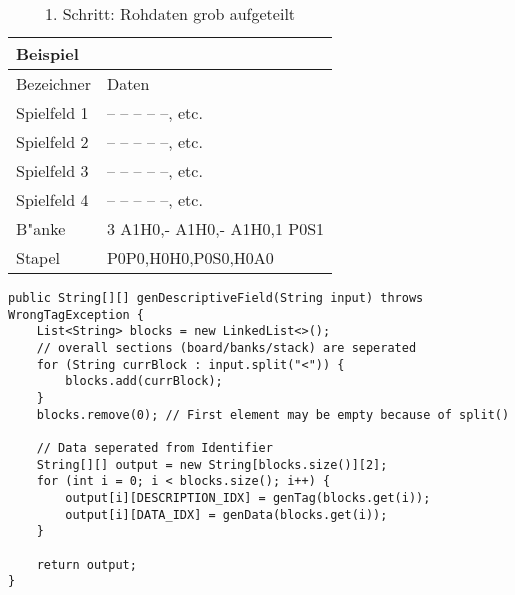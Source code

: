 
\begin{table}
\centering
\begin{tabular}{ll}
\toprule
Beispiel\\
\midrule
Bezeichner & Daten\\
\midrule
Spielfeld 1 & -- -- -- -- --, etc.\\
Spielfeld 2 & -- -- -- -- --, etc.\\
Spielfeld 3 & -- -- -- -- --, etc.\\
Spielfeld 4 & -- -- -- -- --, etc.\\
B"anke & 3 A1H0,- A1H0,- A1H0,1 P0S1\\
Stapel & P0P0,H0H0,P0S0,H0A0\\
\bottomrule
\end{tabular}
\caption{1. Schritt: Rohdaten grob aufgeteilt}
\label{tab:bspRochdaten}
\end{table}
 
\begin{lstlisting}[style=CodeHighlighting,float,caption=Converter - genDescriptiveField,label=lst:converter_genDescriptiveField]
public String[][] genDescriptiveField(String input) throws WrongTagException {
    List<String> blocks = new LinkedList<>();
    // overall sections (board/banks/stack) are seperated
    for (String currBlock : input.split("<")) {
        blocks.add(currBlock);
    }
    blocks.remove(0); // First element may be empty because of split()

    // Data seperated from Identifier
    String[][] output = new String[blocks.size()][2];
    for (int i = 0; i < blocks.size(); i++) {
        output[i][DESCRIPTION_IDX] = genTag(blocks.get(i));
        output[i][DATA_IDX] = genData(blocks.get(i));
    }

    return output;
}
\end{lstlisting}

